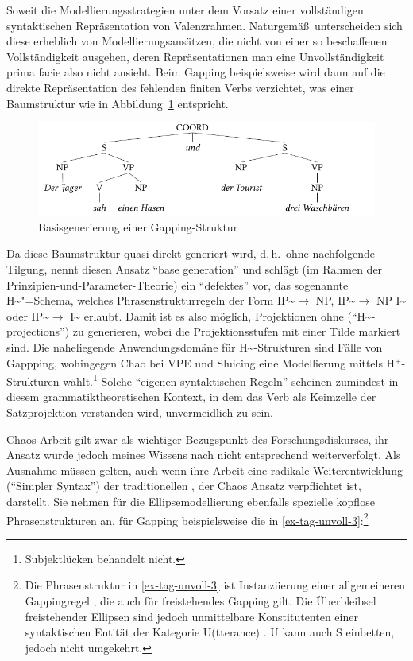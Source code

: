 Soweit die Modellierungsstrategien unter dem Vorsatz einer vollständigen syntaktischen Repräsentation von Valenzrahmen. Naturgemä\ss\ unterscheiden sich diese erheblich von Modellierungsansätzen, die nicht von einer so beschaffenen Vollständigkeit ausgehen, deren Repräsentationen man eine Unvollständigkeit prima facie also nicht ansieht. Beim Gapping beispielsweise wird dann auf die direkte Repräsentation des fehlenden finiten Verbs verzichtet, was einer Baumstruktur wie in Abbildung~\ref{fig-ellipse-unvollstaendig} entspricht.
\begin{figure}[t]
\centering
\includegraphics{graphics/abb83.pdf}
\caption{\label{fig-ellipse-unvollstaendig}Basisgenerierung einer Gapping-Struktur}
\end{figure}
Da diese Baumstruktur quasi direkt generiert wird, d.\,h.\ ohne nachfolgende Tilgung, nennt \cite{Chao:87} diesen Ansatz "`base generation"' und schlägt (im Rahmen der Prinzipien-und-Parameter-Theorie) ein "`defektes"'  vor, das sogenannte H\~{}"=Schema, welches Phrasenstrukturregeln der Form IP\~{}$\to$ NP, IP\~{}$\to$ NP I\~{} oder IP\~{}$\to$ I\~{} erlaubt. Damit ist es also möglich, Projektionen ohne  ("`H\textasciitilde-projections"') zu generieren, wobei die Projektionsstufen mit einer Tilde markiert sind. Die naheliegende Anwendungsdomäne für H\~{}-Strukturen sind Fälle von Gappping, wohingegen Chao bei VPE und Sluicing eine Modellierung mittels H$^{+}$-Strukturen wählt.\footnote{Subjektlücken behandelt \cite{Chao:87} nicht.} Solche "`eigenen syntaktischen Regeln"' \citep[789]{Klein:93} scheinen zumindest in diesem grammatiktheoretischen Kontext, in dem das Verb als Keimzelle der Satzprojektion verstanden wird, unvermeidlich zu sein. 

Chaos Arbeit gilt zwar als wichtiger Bezugspunkt des Forschungsdiskurses, ihr Ansatz wurde jedoch meines Wissens nach nicht entsprechend weiterverfolgt. Als Ausnahme müssen \cite{Culicover:Jackendoff:05} gelten, auch wenn ihre Arbeit eine radikale Weiterentwicklung ("`Simpler Syntax"') der traditionellen , der Chaos Ansatz verpflichtet ist, darstellt. Sie nehmen für die Ellipsemodellierung ebenfalls spezielle kopflose Phrasenstrukturen an, für Gapping beispielsweise die  in \ref{ex-tag-unvoll-3}:\footnote{Die Phrasenstruktur in \ref{ex-tag-unvoll-3} ist Instanziierung einer allgemeineren Gappingregel \citep[276]{Culicover:Jackendoff:05}, die auch für freistehendes Gapping gilt. Die Überbleibsel freistehender Ellipsen sind jedoch unmittelbare Konstitutenten einer syntaktischen Entität der Kategorie U(tterance) \citep[237f]{Culicover:Jackendoff:05}. U kann auch S einbetten, jedoch nicht umgekehrt.}

